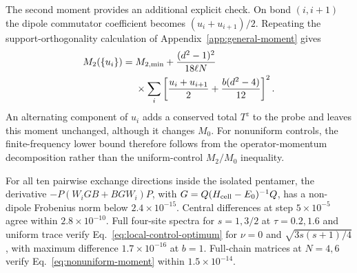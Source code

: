 The second moment provides an additional explicit check. On bond
$(i,i+1)$ the dipole commutator coefficient becomes
$(u_i+u_{i+1})/2$. Repeating the support-orthogonality calculation of
Appendix~\ref{app:general-moment} gives
\begin{align}
 M_2(\{u_i\})={}&M_{2,\min}+\frac{(d^2-1)^2}{18\ell N}\notag\\
 &\times\sum_i\left[\frac{u_i+u_{i+1}}2+
              \frac{b(d^2-4)}{12}\right]^2.
 \label{eq:nonuniform-moment}
\end{align}
An alternating component of $u_i$ adds a conserved total $T^z$ to the
probe and leaves this moment unchanged, although it changes $M_0$.
For nonuniform controls, the finite-frequency lower bound therefore
follows from the operator-momentum decomposition rather than the
uniform-control $M_2/M_0$ inequality.

For all ten pairwise exchange directions inside the isolated pentamer,
the derivative $-P(W_iGB+BGW_i)P$, with
$G=Q(H_{\rm cell}-E_0)^{-1}Q$, has a non-dipole Frobenius norm below
$2.4\times10^{-15}$. Central differences at step $5\times10^{-5}$
agree within $2.8\times10^{-10}$. Full four-site spectra for $s=1,3/2$
at $\tau=0.2,1.6$ and uniform trace verify
Eq.~\eqref{eq:local-control-optimum} for $\nu=0$ and
$\sqrt{3s(s+1)/4}$, with maximum difference $1.7\times10^{-16}$ at
$b=1$. Full-chain matrices at $N=4,6$ verify
Eq.~\eqref{eq:nonuniform-moment} within $1.5\times10^{-14}$.
